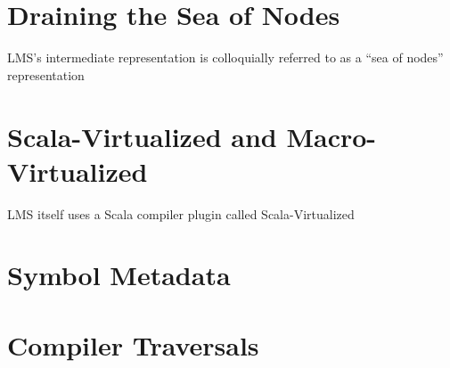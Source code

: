 \section{Draining the Sea of Nodes}
LMS's intermediate representation is colloquially referred to as
a ``sea of nodes'' representation

\section{Scala-Virtualized and Macro-Virtualized}
LMS itself uses a Scala compiler plugin called Scala-Virtualized



\section{Symbol Metadata}

\section{Compiler Traversals}
